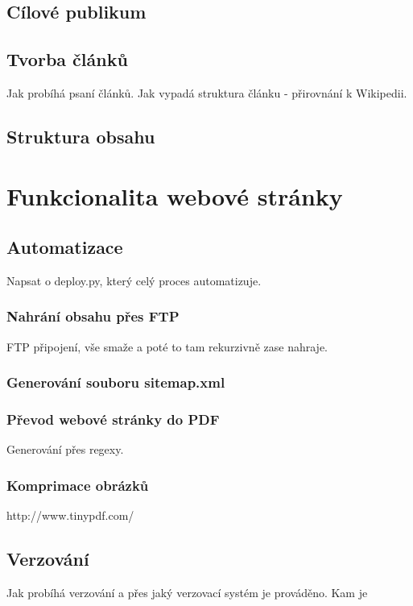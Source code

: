 \documentclass[a4paper, 12pt]{article}
\begin{document}
  \subsection{Cílové publikum}

  \subsection{Tvorba článků}
  Jak probíhá psaní článků.
  Jak vypadá struktura článku - přirovnání k Wikipedii.

  \subsection{Struktura obsahu}

  \section{Funkcionalita webové stránky}

  \subsection{Automatizace}
  Napsat o deploy.py, který celý proces automatizuje.

  \subsubsection{Nahrání obsahu přes FTP}
  FTP připojení, vše smaže a poté to tam rekurzivně zase nahraje.

  \subsubsection{Generování souboru sitemap.xml}

  \subsubsection{Převod webové stránky do PDF}
  Generování přes regexy.

  \subsubsection{Komprimace obrázků}
  http://www.tinypdf.com/

  \subsection{Verzování}
  Jak probíhá verzování a přes jaký verzovací systém je prováděno.
  Kam je
\end{document}
